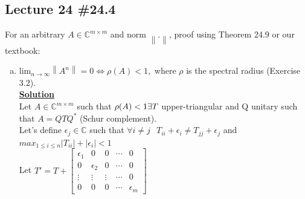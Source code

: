 \documentclass[11pt]{article}
\newcommand{\norm}[1]{\left\lVert#1\right\rVert}
\begin{document}
\begin{enumerate}[(a)]
\end{enumerate}

\subsection*{Lecture 24 \#24.4}
For an arbitrary $A \in \mathbb{C}^{m \times m}$ and norm $\norm{.}$, proof using Theorem 24.9 or our textbook:
\begin{enumerate}[(a)]
\item $\text{lim}_{n \to \infty}{\norm{A^n}} = 0  \iff \rho(A) < 1,$ where $\rho$ is the spectral radius (Exercise 3.2).\\
\underline{\textbf{Solution}}\\
Let $A \in \mathbb{C}^{m \times m}$ such that $\rho(A) < 1\\
\exists T$ upper-triangular  and Q unitary such that $A = QTQ^*$ (Schur complement).\\
Let's define $\epsilon_j \in \mathbb{C}$ such that $\forall i\ne j \:\:\;T_{ii}+ \epsilon_i \ne T_{jj}+\epsilon_j$ and $max_{1\leq i \leq n}{\left|T_{ii}\right| + \left|\epsilon_i\right|} < 1$\\

Let $T' = T + 
\begin{bmatrix}
\epsilon_1 & 0 & 0  & \cdots & 0\\
0 & \epsilon_2 & 0 & \cdots & 0\\
\vdots & \vdots & \vdots & \cdots & 0\\
0 & 0 & 0 & \cdots & \epsilon_m
\end{bmatrix}
$\\


\end{enumerate}
\end{document}
